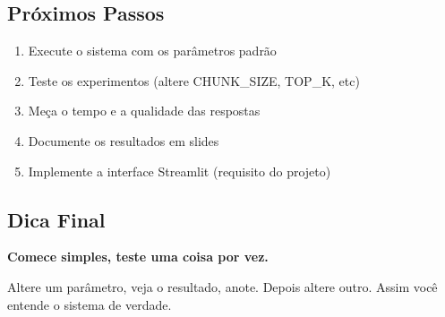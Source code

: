 \documentclass[12pt,a4paper]{article}
\begin{document}
\subsection{Próximos Passos}

\begin{enumerate}
    \item Execute o sistema com os parâmetros padrão
    \item Teste os experimentos (altere CHUNK\_SIZE, TOP\_K, etc)
    \item Meça o tempo e a qualidade das respostas
    \item Documente os resultados em slides
    \item Implemente a interface Streamlit (requisito do projeto)
\end{enumerate}

\subsection{Dica Final}

\textbf{Comece simples, teste uma coisa por vez.}

Altere um parâmetro, veja o resultado, anote. Depois altere outro. Assim você entende o sistema de verdade.
\end{document}
